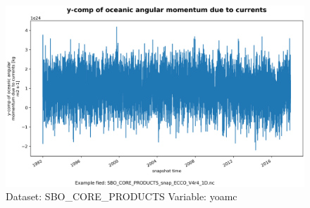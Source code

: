 \begin{figure}[H]
\centering
\includegraphics[width=\textwidth]{../images/plots/oneD_plots/SBO_Core_Products/yoamc.png}
\caption{Dataset: SBO\_CORE\_PRODUCTS Variable: yoamc}
\label{tab:table-SBO_CORE_PRODUCTS_yoamc-Plot}
\end{figure}
\pagebreak
